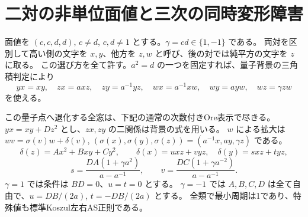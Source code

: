 \section{二対の非単位面値と三次の同時変形障害}
\label{sec:quantum-double-pair}
面値を $(c,c,d,d)$, $c\ne d$, $c,d\ne1$ とする。$\gamma=cd\in\{1,-1\}$ である。
両対を区別して高い側の文字を $x,y$、他方を $z,w$ と呼び、後の対では純平方の文字を $z$ に取る。
この選び方を全て許す。$a^2=d$ の一つを固定すれば、量子背景の三角積判定により
\[
 yx=xy,\quad zx=a xz,\quad zy=a^{-1}yz,\quad
 wx=a^{-1}xw,\quad wy=a yw,\quad wz=\gamma zw
\]
を使える。
\begin{theorem}\label{thm:quantum-double-pair}
この量子点へ退化する全窓は、下記の通常の次数付きOre表示で尽きる。
$yx=xy+D z^2$ とし、$zx,zy$ の二関係は背景の式を用いる。
$w$ による拡大は $w v=\sigma(v)w+\delta(v)$,
$(\sigma(x),\sigma(y),\sigma(z))=(a^{-1}x,ay,\gamma z)$ である。
\[
 \delta(z)=Ax^2+Bxy+Cy^2,\qquad
 \delta(x)=u xz+v yz,\quad \delta(y)=s xz+t yz,
\]
\[
 s=\frac{DA(1+\gamma a^2)}{a-a^{-1}},\qquad
 v=\frac{DC(1+\gamma a^{-2})}{a-a^{-1}} .
\]
$\gamma=1$ では条件は $BD=0$、$u=t=0$ とする。
$\gamma=-1$ では $A,B,C,D$ は全て自由で、$u=DB/(2a)$, $t=-DB/(2a)$ とする。
全類で最小周期は1であり、特殊値も標準Koszul左右AS正則である。
\end{theorem}

